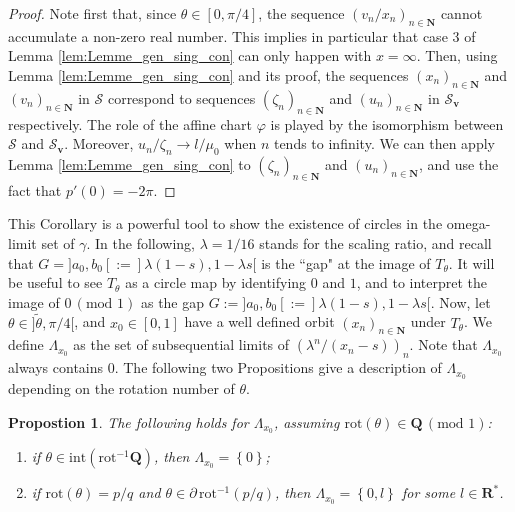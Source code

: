\documentclass[11pt]{article}
\newtheorem{prop}[thm]{Propostion}
\begin{document}
\begin{proof}
Note first that, since $\theta\in[0,\pi/4]$, the sequence $(v_{n}/x_{n})_{n\in\mathbf{N}}$ cannot accumulate a non-zero real number. This implies in particular that case 3 of Lemma \ref{lem:Lemme_gen_sing_con} can only happen with $x=\infty$. Then, using Lemma \ref{lem:Lemme_gen_sing_con} and its proof, the sequences $(x_{n})_{n\in\mathbf{N}}$ and $(v_{n})_{n\in\mathbf{N}}$ in $\mathcal{S}$ correspond to sequences $(\zeta_{n})_{n\in\mathbf{N}}$ and $(u_{n})_{n\in\mathbf{N}}$ in $\mathcal{S}_{\mathbf{v}}$ respectively. The role of the affine chart $\varphi$ is played by the isomorphism between $\mathcal{S}$ and $\mathcal{S}_{\mathbf{v}}$. Moreover, $u_{n}/\zeta_{n}\rightarrow l/\mu_{0}$ when $n$ tends to infinity. We can then apply Lemma \ref{lem:Lemme_gen_sing_con} to $(\zeta_{n})_{n\in\mathbf{N}}$ and $(u_{n})_{n\in\mathbf{N}}$, and use the fact that $p'(0)=-2\pi$.
\end{proof}

This Corollary is a powerful tool to show the existence of circles in the omega-limit set of $\gamma$. In the following, $\lambda=1/16$ stands for the scaling ratio, and recall that $G=]a_{0},b_{0}[:=]\lambda\left(1-s\right),1-\lambda s[$ is the ``gap" at the image of $T_{\theta}$. It will be useful to see $T_{\theta}$ as a circle map by identifying $0$ and $1$, and to interpret the image of $0\,(\text{mod }1)$ as the gap $G:=]a_{0},b_{0}[:=]\lambda\left(1-s\right),1-\lambda s[$. Now, let $\theta\in\bigl]\widetilde{\theta},\pi/4\bigr[$, and $x_{0}\in[0,1]$ have a well defined orbit $(x_{n})_{n\in\mathbf{N}}$ under $T_{\theta}$. We define $\Lambda_{x_{0}}$ as the set of subsequential limits of $\left(\lambda^{n}/(x_{n}-s)\right)_{n}$. Note that $\Lambda_{x_{0}}$ always contains 0. The following two Propositions give a description of $\Lambda_{x_{0}}$ depending on the rotation number of $\theta$.

\begin{prop}
\label{prop:Val_adh_rot_rat}
The following holds for $\Lambda_{x_{0}}$, assuming $\text{rot}(\theta)\in\mathbf{Q}\,(\text{mod }1)$:
    \begin{enumerate}
        \item if $\theta\in\text{int}\left(\text{rot}^{-1}\mathbf{Q}\right)$, then $\Lambda_{x_{0}}=\left\{0\right\}$;
        \item if $\text{rot}(\theta)=p/q$ and $\theta\in\partial\,\text{rot}^{-1}(p/q)$, then $\Lambda_{x_{0}}=\left\{0,l\right\}$ for some $l\in\mathbf{R}^{*}$.
    \end{enumerate}
\end{prop}
\end{document}
